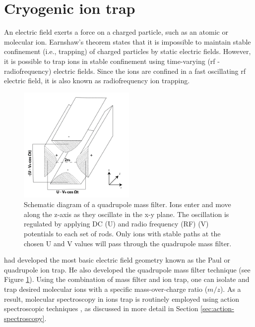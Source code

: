 \section{Cryogenic ion trap}

An electric field exerts a force on a charged particle, such as an atomic or molecular ion. Earnshaw's \cite{earnshaw_nature_1848} theorem states that it is impossible to maintain stable confinement (i.e., trapping) of charged particles by static electric fields. However, it is possible to trap ions in stable confinement using time-varying (rf - radiofrequency) electric fields. Since the ions are confined in a fast oscillating rf electric field, it is also known as radiofrequency ion trapping.

\begin{figure}[!htb]
    \centering
    \includegraphics[width=0.5\textwidth]{figures/intro/trap/Quadrupole.png}
    \caption{Schematic diagram of a quadrupole mass filter. Ions enter and move along the z-axis as they oscillate in the x-y plane. The oscillation is regulated by applying DC (U) and radio frequency (RF) (V) potentials to each set of rods. Only ions with stable paths at the chosen U and V values will pass through the quadrupole mass filter.}
    \label{fig:quadrupole}
\end{figure}

\citet{paul_ionenka_1955} had developed the most basic electric field geometry known as the Paul or quadrupole ion trap. He also developed the quadrupole mass filter technique \cite{paul_elektrische_1955} (see Figure \ref{fig:quadrupole}). Using the combination of mass filter and ion trap, one can isolate and trap desired molecular ions with a specific mass-over-charge ratio ($m/z$). As a result, molecular spectroscopy in ions trap is routinely employed using action spectroscopic techniques \cite{SA2019, Roithovareview, Asvany2021}, as discussed in more detail in Section \ref{sec:action-spectroscopy}.

